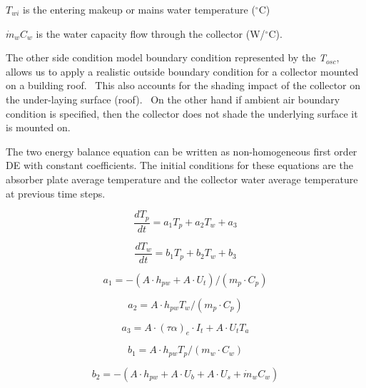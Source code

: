 \(T_{wi}\) is the entering makeup or mains water temperature (\(^{\circ}\)C)

\({\dot m_w}{C_w}\) is the water capacity flow through the collector (W/\(^{\circ}\)C).

The other side condition model boundary condition represented by the \emph{T\(_{osc}\)}, allows us to apply a realistic outside boundary condition for a collector mounted on a building roof.~ This also accounts for the shading impact of the collector on the under-laying surface (roof).~ On the other hand if ambient air boundary condition is specified, then the collector does not shade the underlying surface it is mounted on.

The two energy balance equation can be written as non-homogeneous first order DE with constant coefficients. The initial conditions for these equations are the absorber plate average temperature and the collector water average temperature at previous time steps.

\begin{equation}
\frac{{d{T_p}}}{{dt}} = {a_1}{T_p} + {a_2}{T_w} + {a_3}
\end{equation}

\begin{equation}
\frac{{d{T_w}}}{{dt}} = {b_1}{T_p} + {b_2}{T_w} + {b_3}
\end{equation}

\begin{equation}
{a_1} =  - \left( {A \cdot {h_{pw}} + A \cdot {U_t}} \right)/\left( {{m_p} \cdot {C_p}} \right)
\end{equation}

\begin{equation}
{a_2} = A \cdot {h_{pw}}{T_w}/\left( {{m_p} \cdot {C_p}} \right)
\end{equation}

\begin{equation}
{a_3} = A \cdot {\left( {\tau \alpha } \right)_e} \cdot {I_t} + A \cdot {U_t}{T_a}
\end{equation}

\begin{equation}
{b_1} = A \cdot {h_{pw}}{T_p}/\left( {{m_w} \cdot {C_w}} \right)
\end{equation}

\begin{equation}
{b_2} =  - \left( {A \cdot {h_{pw}} + A \cdot {U_b} + A \cdot {U_s} + {{\dot m}_w}{C_w}} \right)
\end{equation}

